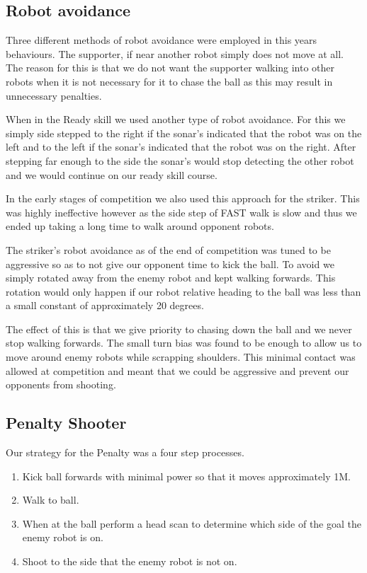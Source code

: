 \documentclass[pdftex,11pt,a4paper]{report}
\begin{document}
\subsection{Robot avoidance}
Three different methods of robot avoidance were employed in this years behaviours. The supporter, if near another robot simply does not move at all. The reason for this is that we do not want the supporter walking into other robots when it is not necessary for it to chase the ball as this may result in unnecessary penalties.

When in the Ready skill we used another type of robot avoidance. For this we simply side stepped to the right if the sonar's indicated that the robot was on the left and to the left if the sonar's indicated that the robot was on the right. After stepping far enough to the side the sonar's would stop detecting the other robot and we would continue on our ready skill course.

In the early stages of competition we also used this approach for the striker. This was highly ineffective however as the side step of FAST walk is slow and thus we ended up taking a long time to walk around opponent robots.

The striker's robot avoidance as of the end of competition was tuned to be aggressive so as to not give our opponent time to kick the ball. To avoid we simply rotated away from the enemy robot and kept walking forwards. This rotation would only happen if our robot relative heading to the ball was less than a small constant of approximately 20 degrees.

The effect of this is that we give priority to chasing down the ball and we never stop walking forwards. The small turn bias was found to be enough to allow us to move around enemy robots while scrapping shoulders. This minimal contact was allowed at competition and meant that we could be aggressive and prevent our opponents from shooting.


\subsection{Penalty Shooter}
Our strategy for the Penalty was a four step processes.

\begin{enumerate}
\item Kick ball forwards with minimal power so that it moves approximately 1M.
\item Walk to ball.
\item When at the ball perform a head scan to determine which side of the goal the enemy robot is on.
\item Shoot to the side that the enemy robot is not on.
\end{enumerate}
\end{document}
